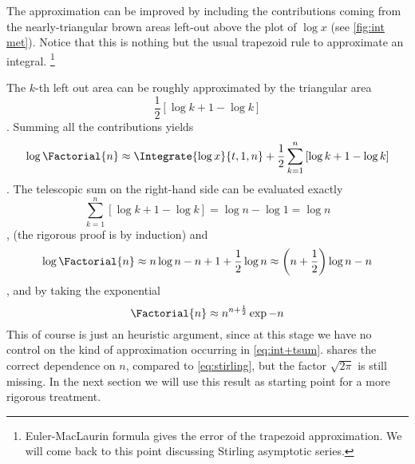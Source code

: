 \documentclass[onecolumn,a4paper,11pt]{article}
\theoremstyle{classicdef}
\theoremstyle{remark}
\begin{document}
The approximation can be 
improved by including the
contributions coming from the nearly-triangular brown areas left-out above the
plot of $\log x$ (see \cref{fig:int met}).
Notice that this is nothing but the usual trapezoid rule to approximate an
integral.%
\footnote{Euler-MacLaurin formula gives the error of the trapezoid  approximation.
 We will come back to this point discussing Stirling asymptotic series.}

The $k$-th left out area can be roughly approximated by the triangular area 
\begin{dmath*}
\frac{1}{2} \left[ \log {k+1} - \log k \right ] 
\end{dmath*}.
Summing all the contributions yields
   \begin{dmath}[label={int+tsum}]
      \log{\Factorial{n}}\approx \Integrate{ \log x }{t,1, n} + \frac{1}{2} \sum_{k=1}^{n}
\left[ \log  {k+1} - \log k \right] 
\end{dmath}.
The telescopic sum on the right-hand side can be evaluated exactly
\begin{dmath}
\sum_{k=1}^{n} \left[ \log {k+1} - \log k \right] = \log n - \log 1 = \log n
\end{dmath},
(the rigorous proof is by induction) and
\begin{dmath}[compact]
   \log{\Factorial{n}} \approx n \log n - n+1 + \frac{1}{2}\log n 
\approx  \left( n + \frac{1}{2} \right) \log n -n  
\end{dmath},
and by taking the exponential 
\begin{dmath}[label={int guess exp}]
   \Factorial{n} \approx n^{n+\frac{1}{2}} \exp{-n} 
\end{dmath}
This of course is just an heuristic argument, since at this stage we have no control 
on the
kind of approximation occurring in \cref{eq:int+tsum}.
 shares the correct dependence on $n$, compared to
\cref{eq:stirling}, but the factor
$\sqrt{2\pi}$ is still missing. 
In the next section we will use this result as  starting point for a
more rigorous treatment. 
\end{document}
